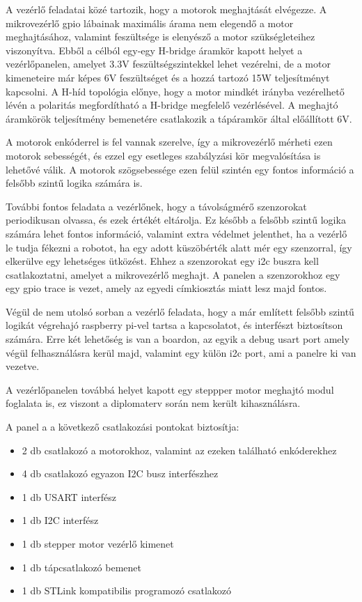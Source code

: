 
A vezérlő feladatai közé tartozik, hogy a motorok meghajtását elvégezze. A
mikrovezérlő gpio lábainak maximális árama nem elegendő a motor meghajtásához,
valamint feszültsége is elenyésző a motor szükségleteihez viszonyítva. Ebből a
célból egy-egy H-bridge áramkör kapott helyet a vezérlőpanelen, amelyet 3.3V
feszültségszintekkel lehet vezérelni, de a motor kimeneteire már képes 6V
feszültséget és a hozzá tartozó 15W teljesítményt kapcsolni. A H-híd topológia
előnye, hogy a motor mindkét irányba vezérelhető lévén a polaritás megfordítható
a H-bridge megfelelő vezérlésével. A meghajtó áramkörök teljesítmény bemenetére
csatlakozik a tápáramkör által előállított 6V.

A motorok enkóderrel is fel vannak szerelve, így a mikrovezérlő mérheti ezen
motorok sebességét, és ezzel egy esetleges szabályzási kör megvalósítása
is lehetővé válik. A motorok szögsebessége ezen felül szintén egy fontos
információ a felsőbb szintű logika számára is.

További fontos feladata a vezérlőnek, hogy a távolságmérő szenzorokat
periodikusan olvassa, és ezek értékét eltárolja. Ez később a felsőbb szintű
logika számára lehet fontos információ, valamint extra védelmet jelenthet, ha a
vezérlő le tudja fékezni a robotot, ha egy adott küszöbérték alatt mér egy
szenzorral, így elkerülve egy lehetséges ütközést. Ehhez a szenzorokat egy
i2c buszra kell csatlakoztatni, amelyet a mikrovezérlő meghajt. A panelen
a szenzorokhoz egy egy gpio trace is vezet, amely az egyedi címkiosztás miatt
lesz majd fontos.

Végül de nem utolsó sorban a vezérlő feladata, hogy a már említett felsőbb szintű
logikát végrehajó raspberry pi-vel tartsa a kapcsolatot, és interfészt
biztosítson számára. Erre két lehetőség is van a boardon, az egyik a debug usart
port amely végül felhasználásra kerül majd, valamint egy külön i2c port, ami a
panelre ki van vezetve.

A vezérlőpanelen továbbá helyet kapott egy steppper motor meghajtó modul
foglalata is, ez viszont a diplomaterv során nem került kihasználásra.


A panel a a következő csatlakozási pontokat biztosítja:

\begin{itemize}
\item 2 db csatlakozó a motorokhoz, valamint az ezeken található enkóderekhez
\item 4 db csatlakozó egyazon I2C busz interfészhez
\item 1 db USART interfész
\item 1 db I2C interfész
\item 1 db stepper motor vezérlő kimenet
\item 1 db tápcsatlakozó bemenet
\item 1 db STLink kompatibilis programozó csatlakozó
\end{itemize}

